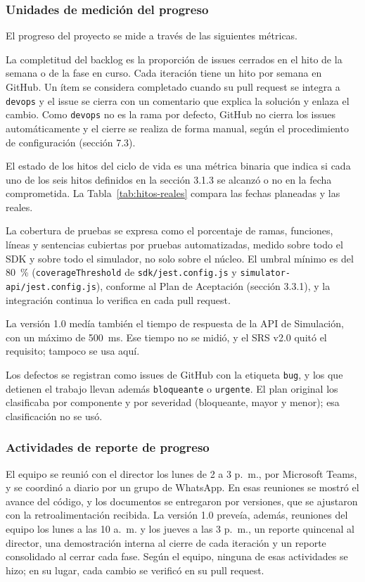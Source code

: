 \subsubsection{Unidades de medición del progreso}

El progreso del proyecto se mide a través de las siguientes métricas.

La completitud del backlog es la proporción de issues cerrados en el hito de la semana o de la fase en curso. Cada iteración tiene un hito por semana en GitHub. Un ítem se considera completado cuando su pull request se integra a \texttt{devops} y el issue se cierra con un comentario que explica la solución y enlaza el cambio. Como \texttt{devops} no es la rama por defecto, GitHub no cierra los issues automáticamente y el cierre se realiza de forma manual, según el procedimiento de configuración (sección 7.3).

El estado de los hitos del ciclo de vida es una métrica binaria que indica si cada uno de los seis hitos definidos en la sección 3.1.3 se alcanzó o no en la fecha comprometida. La Tabla~\ref{tab:hitos-reales} compara las fechas planeadas y las reales.

La cobertura de pruebas se expresa como el porcentaje de ramas, funciones, líneas y sentencias cubiertas por pruebas automatizadas, medido sobre todo el SDK y sobre todo el simulador, no solo sobre el núcleo. El umbral mínimo es del 80~\% (\texttt{coverageThreshold} de \texttt{sdk/jest.config.js} y \texttt{simulator-api/jest.config.js}), conforme al Plan de Aceptación (sección 3.3.1), y la integración continua lo verifica en cada pull request.

La versión 1.0 medía también el tiempo de respuesta de la API de Simulación, con un máximo de 500~ms. Ese tiempo no se midió, y el SRS v2.0 quitó el requisito; tampoco se usa aquí.

Los defectos se registran como issues de GitHub con la etiqueta \texttt{bug}, y los que detienen el trabajo llevan además \texttt{bloqueante} o \texttt{urgente}. El plan original los clasificaba por componente y por severidad (bloqueante, mayor y menor); esa clasificación no se usó.

\subsubsection{Actividades de reporte de progreso}

El equipo se reunió con el director los lunes de 2 a 3 p.~m., por Microsoft Teams, y se coordinó a diario por un grupo de WhatsApp. En esas reuniones se mostró el avance del código, y los documentos se entregaron por versiones, que se ajustaron con la retroalimentación recibida. La versión 1.0 preveía, además, reuniones del equipo los lunes a las 10 a.~m. y los jueves a las 3 p.~m., un reporte quincenal al director, una demostración interna al cierre de cada iteración y un reporte consolidado al cerrar cada fase. Según el equipo, ninguna de esas actividades se hizo; en su lugar, cada cambio se verificó en su pull request.

